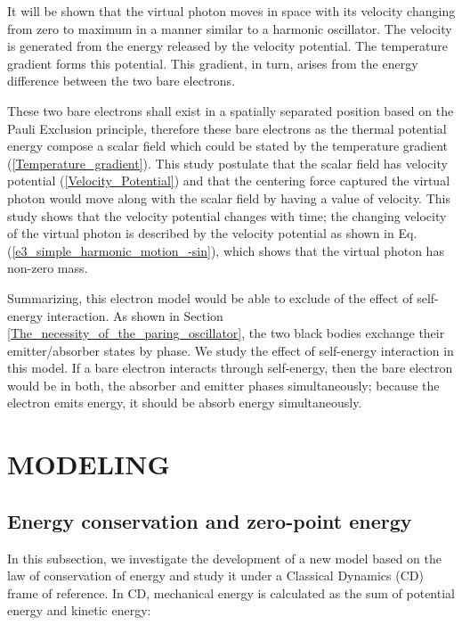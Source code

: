 \documentclass[%
 reprint,
 amsmath,amssymb,
 aps,
]{revtex4-1}
\numberwithin{equation}{section}%
\begin{document}
    It will be shown that the virtual photon moves in space with its velocity changing from zero to maximum in a manner similar to a harmonic oscillator. The velocity is generated from the energy released by the velocity potential. The temperature gradient forms this potential. This gradient, in turn, arises from the energy difference between the two bare electrons.
    
    These two bare electrons shall exist in a spatially separated position based on the Pauli Exclusion principle, therefore these bare electrons as the thermal potential energy compose a scalar field which could be stated by the temperature gradient (\ref{Temperature_gradient}). This study postulate that the scalar field has velocity potential (\ref{Velocity_Potential}) and that the centering force captured the virtual photon would move along with the scalar field by having a value of velocity. This study shows that the velocity potential changes with time; the changing velocity of the virtual photon is described by the velocity potential as shown in Eq.(\ref{e3_simple_harmonic_motion_-sin}), which shows that the virtual photon has non-zero mass.

    Summarizing, this electron model would be able to exclude of the effect of self-energy interaction. As shown in Section \ref{The_necessity_of_the_paring_oscillator}, the two black bodies exchange their emitter/absorber states by phase. We study the effect of self-energy interaction in this model. If a bare electron interacts through self-energy, then the bare electron would be in both, the absorber and emitter phases simultaneously; because the electron emits energy, it should be absorb energy simultaneously.




\section{\label{sec:MODELING}MODELING}


\subsection{Energy conservation and zero-point energy}  \label{Energy_conservation_and_zero-point_energy}  


    In this subsection, we investigate the development of a new model based on the law of conservation of energy and study it under a Classical Dynamics (CD) frame of reference. In CD, mechanical energy is calculated as the sum of potential energy and kinetic energy:
    
\end{document}
